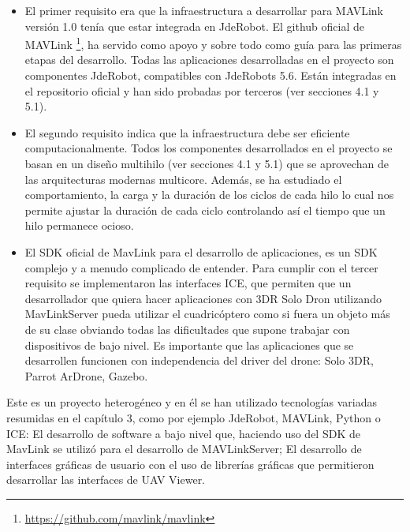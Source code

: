 \begin{itemize}
\item El primer requisito era que la infraestructura a desarrollar para MAVLink versión 1.0 tenía que estar integrada en JdeRobot. El github oficial de MAVLink \footnote{\url{https://github.com/mavlink/mavlink}}, ha servido como apoyo y sobre todo como guía para las primeras etapas del desarrollo. Todas las aplicaciones desarrolladas en el proyecto son componentes JdeRobot, compatibles con JdeRobots 5.6. Están integradas en el repositorio oficial y han sido probadas por terceros (ver secciones 4.1 y 5.1).
\item El segundo requisito indica que la infraestructura debe ser eficiente computacionalmente. Todos los componentes desarrollados en el proyecto se basan en un diseño multihilo (ver secciones 4.1 y 5.1) que se aprovechan de las arquitecturas modernas multicore. Además, se ha estudiado el comportamiento, la carga y la duración de los ciclos de cada hilo lo cual nos permite ajustar la
duración de cada ciclo controlando así el tiempo que un hilo permanece ocioso.
\item El SDK oficial de MavLink para el desarrollo de aplicaciones, es un SDK complejo y a menudo complicado de entender. Para cumplir con el tercer requisito se implementaron las interfaces ICE, que permiten que un desarrollador que quiera hacer aplicaciones con 3DR Solo Dron utilizando MavLinkServer pueda utilizar el cuadricóptero como si fuera un objeto más de su clase obviando todas las dificultades que supone trabajar con dispositivos de bajo nivel. Es importante que las aplicaciones que se desarrollen funcionen con independencia del driver del drone: Solo 3DR, Parrot ArDrone, Gazebo.

\end{itemize}

Este es un proyecto heterogéneo y en él se han utilizado tecnologías variadas resumidas en el capítulo 3, como por ejemplo JdeRobot, MAVLink, Python o ICE: El desarrollo de software a bajo nivel que, haciendo uso del SDK de MavLink se utilizó para el desarrollo de MAVLinkServer; El desarrollo de interfaces gráficas de usuario con el uso de librerías gráficas que permitieron desarrollar las interfaces de UAV Viewer.

